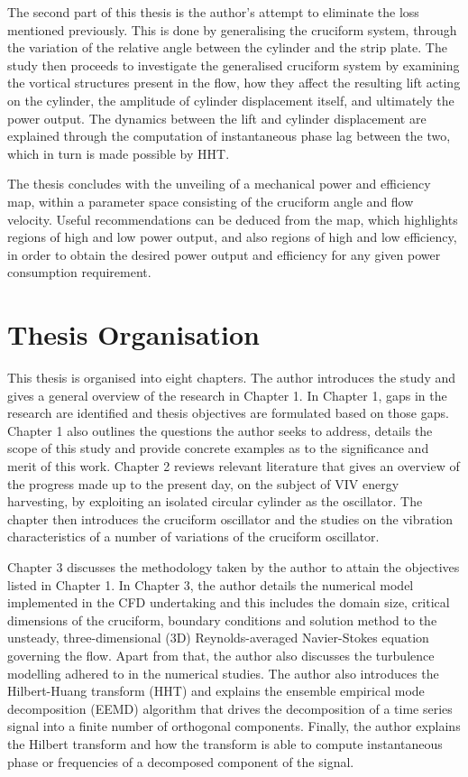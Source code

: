 \documentclass[oneside]{utmthesis}
\begin{document}
The second part of this thesis is the author's attempt to eliminate the loss mentioned previously. This is done by generalising the cruciform system, through the variation of the relative angle between the cylinder and the strip plate. The study then proceeds to investigate the generalised cruciform system by examining the vortical structures present in the flow, how they affect the resulting lift acting on the cylinder, the amplitude of cylinder displacement itself, and ultimately the power output. The dynamics between the lift and cylinder displacement are explained through the computation of instantaneous phase lag between the two, which in turn is made possible by HHT.

The thesis concludes with the unveiling of a mechanical power and efficiency map, within a parameter space consisting of the cruciform angle and flow velocity. Useful recommendations can be deduced from the map, which highlights regions of high and low power output, and also regions of high and low efficiency, in order to obtain the desired power output and efficiency for any given power consumption requirement.

\section{Thesis Organisation}
This thesis is organised into eight chapters. The author introduces the study and gives a general overview of the research in Chapter 1. In Chapter 1, gaps in the research are identified and thesis objectives are formulated based on those gaps. Chapter 1 also outlines the questions the author seeks to address, details the scope of this study and provide concrete examples as to the significance and merit of this work. Chapter 2 reviews relevant literature that gives an overview of the progress made up to the present day, on the subject of VIV energy harvesting, by exploiting an isolated circular cylinder as the oscillator. The chapter then introduces the cruciform oscillator and the studies on the vibration characteristics of a number of variations of the cruciform oscillator.

Chapter 3 discusses the methodology taken by the author to attain the objectives listed in Chapter 1. In Chapter 3, the author details the numerical model implemented in the CFD undertaking and this includes the domain size, critical dimensions of the cruciform, boundary conditions and solution method to the unsteady, three-dimensional (3D) Reynolds-averaged Navier-Stokes equation governing the flow. Apart from that, the author also discusses the turbulence modelling adhered to in the numerical studies. The author also introduces the Hilbert-Huang transform (HHT) and explains the ensemble empirical mode decomposition (EEMD) algorithm that drives the decomposition of a time series signal into a finite number of orthogonal components. Finally, the author explains the Hilbert transform and how the transform is able to compute instantaneous phase or frequencies of a decomposed component of the signal.
\end{document}

